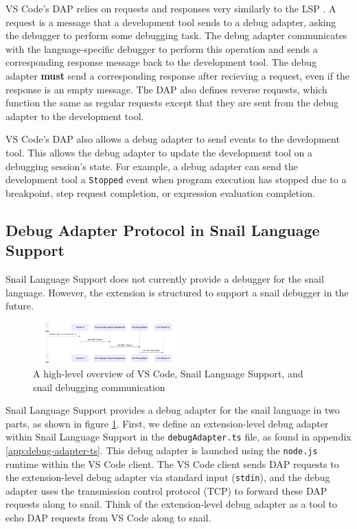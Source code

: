 \documentclass{article}
\begin{document}
VS Code's DAP relies on requests and responses very similarly to the LSP \cite{Microsoft_2021b}. A request is a message that a development tool sends to a debug adapter, asking the debugger to perform some debugging task. The debug adapter communicates with the language-specific debugger to perform this operation and sends a corresponding response message back to the development tool. The debug adapter \textbf{must} send a corresponding response after recieving a request, even if the response is an empty message. The DAP also defines reverse requests, which function the same as regular requests except that they are sent from the debug adapter to the development tool.

VS Code's DAP also allows a debug adapter to send events to the development tool. This allows the debug adapter to update the development tool on a debugging session's state. For example, a debug adapter can send the development tool a \lstinline{Stopped} event when program execution has stopped due to a breakpoint, step request completion, or expression evaluation completion. 

\subsection{Debug Adapter Protocol in Snail Language Support}

Snail Language Support does not currently provide a debugger for the snail language. However, the extension is structured to support a snail debugger in the future. 

\begin{figure}
    \begin{center}
        \includegraphics[width=0.5\textwidth]{png/dap-highlevel.png}
        \caption{
            \centering 
            A high-level overview of VS Code, Snail Language Support, and snail debugging communication
        }
        \label{fig:dap-high-level}
    \end{center}
\end{figure}

Snail Language Support provides a debug adapter for the snail language in two parts, as shown in figure \ref{fig:dap-high-level}. First, we define an extension-level debug adapter within Snail Language Support in the \lstinline{debugAdapter.ts} file, as found in appendix \ref{app:debug-adapter-ts}. This debug adapter is launched using the \lstinline{node.js} runtime within the VS Code client. The VS Code client sends DAP requests to the extension-level debug adapter via standard input (\lstinline{stdin}), and the debug adapter uses the transmission control protocol (TCP) to forward these DAP requests along to snail. Think of the extension-level debug adapter as a tool to echo DAP requests from VS Code along to snail. 
\end{document}
